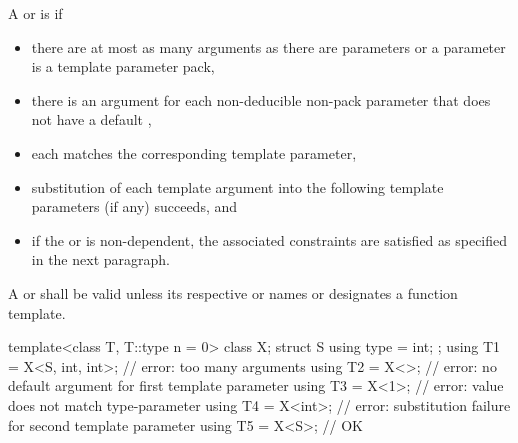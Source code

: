 \pnum
A  or 
is  if
\begin{itemize}
\item
  there are at most as many arguments as there are parameters
  or a parameter is a template parameter pack,

\item
  there is an argument for each non-deducible non-pack parameter
  that does not have a default ,

\item
  each  matches the corresponding
  template parameter,

\item
  substitution of each template argument into the following
  template parameters (if any) succeeds, and

\item
  if the  or
   is non-dependent,
  the associated constraints are satisfied as specified in the next paragraph.
\end{itemize}
A  or
shall be valid unless its respective
 or 
names or designates a function template.
\begin{example}
\begin{codeblock}
template<class T, T::type n = 0> class X;
struct S {
  using type = int;
};
using T1 = X<S, int, int>;      // error: too many arguments
using T2 = X<>;                 // error: no default argument for first template parameter
using T3 = X<1>;                // error: value  does not match type-parameter
using T4 = X<int>;              // error: substitution failure for second template parameter
using T5 = X<S>;                // OK
\end{codeblock}
\end{example}

